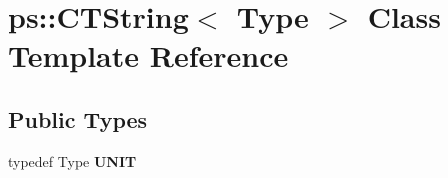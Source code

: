 \hypertarget{classps_1_1CTString}{}\section{ps\+:\+:C\+T\+String$<$ Type $>$ Class Template Reference}
\label{classps_1_1CTString}
\subsection*{Public Types}
\begin{DoxyCompactItemize}
\item 
\hypertarget{classps_1_1CTString_a76e139d2c821e9063a6bcd08033555bb}{}typedef Type {\bfseries U\+N\+I\+T}\label{classps_1_1CTString_a76e139d2c821e9063a6bcd08033555bb}

\end{DoxyCompactItemize}
